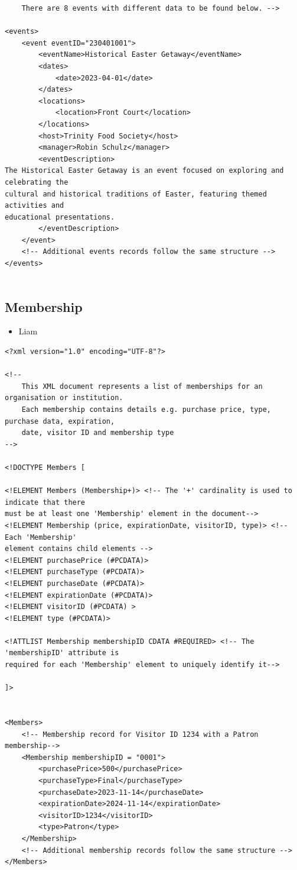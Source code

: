 \documentclass{article} %
\begin{document}
\begin{verbatim}
    There are 8 events with different data to be found below. -->

<events>
    <event eventID="230401001">
        <eventName>Historical Easter Getaway</eventName>
        <dates>
            <date>2023-04-01</date>
        </dates>
        <locations>
            <location>Front Court</location>
        </locations>
        <host>Trinity Food Society</host>
        <manager>Robin Schulz</manager>
        <eventDescription>
The Historical Easter Getaway is an event focused on exploring and celebrating the 
cultural and historical traditions of Easter, featuring themed activities and 
educational presentations.
        </eventDescription>
    </event>
    <!-- Additional events records follow the same structure -->
</events>
    
\end{verbatim}

\subsection{Membership}

\begin{itemize}
    \item Liam
\end{itemize}

\begin{verbatim}
<?xml version="1.0" encoding="UTF-8"?>

<!-- 
    This XML document represents a list of memberships for an organisation or institution. 
    Each membership contains details e.g. purchase price, type, purchase data, expiration, 
    date, visitor ID and membership type
-->

<!DOCTYPE Members [

<!ELEMENT Members (Membership+)> <!-- The '+' cardinality is used to indicate that there 
must be at least one 'Membership' element in the document-->
<!ELEMENT Membership (price, expirationDate, visitorID, type)> <!-- Each 'Membership' 
element contains child elements -->
<!ELEMENT purchasePrice (#PCDATA)>
<!ELEMENT purchaseType (#PCDATA)>
<!ELEMENT purchaseDate (#PCDATA)>
<!ELEMENT expirationDate (#PCDATA)>
<!ELEMENT visitorID (#PCDATA) >
<!ELEMENT type (#PCDATA)>

<!ATTLIST Membership membershipID CDATA #REQUIRED> <!-- The 'membershipID' attribute is 
required for each 'Membership' element to uniquely identify it-->

]>


<Members>
    <!-- Membership record for Visitor ID 1234 with a Patron membership-->
    <Membership membershipID = "0001">
        <purchasePrice>500</purchasePrice>
        <purchaseType>Final</purchaseType>
        <purchaseDate>2023-11-14</purchaseDate>
        <expirationDate>2024-11-14</expirationDate>
        <visitorID>1234</visitorID>
        <type>Patron</type>
    </Membership>
    <!-- Additional membership records follow the same structure -->
</Members>
    
\end{verbatim}
\end{document}
